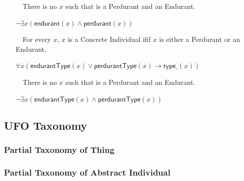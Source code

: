 \documentclass{article}
\newcommand{\BeginThingTaxonomy}{4}
\newcommand{\EndThingTaxonomy}{49}
\newcommand{\AxLabel}{a}
\newcounter{cntax}
\newcommand{\myax}[1]{\refstepcounter{cntax}{\bf \small \AxLabel\thecntax}\label{#1}$\,\,\,\,$}
\newcommand{\me}[1]{\textsf{#1}}
\begin{document}
\begin{itemize}
    \item[\myax{ax_concreteIndividual_partition}] There is no $x$ such that is a \me{Perdurant} and an \me{Endurant}.
    
    $\neg \exists x(\textsf{endurant}(x)\wedge \textsf{perdurant}(x))$

    

    
    \item[\myax{ax_type_taxonomy}] For every $x$, $x$ is a \me{Concrete Individual} ifif $x$ is either a \me{Perdurant} or an \me{Endurant}.
    
    $\forall x(\textsf{endurantType}(x)\vee \textsf{perdurantType}(x)\rightarrow \textsf{type\_}(x))$

    


    \item[\myax{ax_type_partition}] There is no $x$ such that is a \me{Perdurant} and an \me{Endurant}.
    
    $\neg \exists x(\textsf{endurantType}(x)\wedge \textsf{perdurantType}(x))$

    
\end{itemize}

\subsection{UFO Taxonomy}

\subsubsection{Partial Taxonomy of Thing}




\subsubsection{Partial Taxonomy of Abstract Individual}
\end{document}
